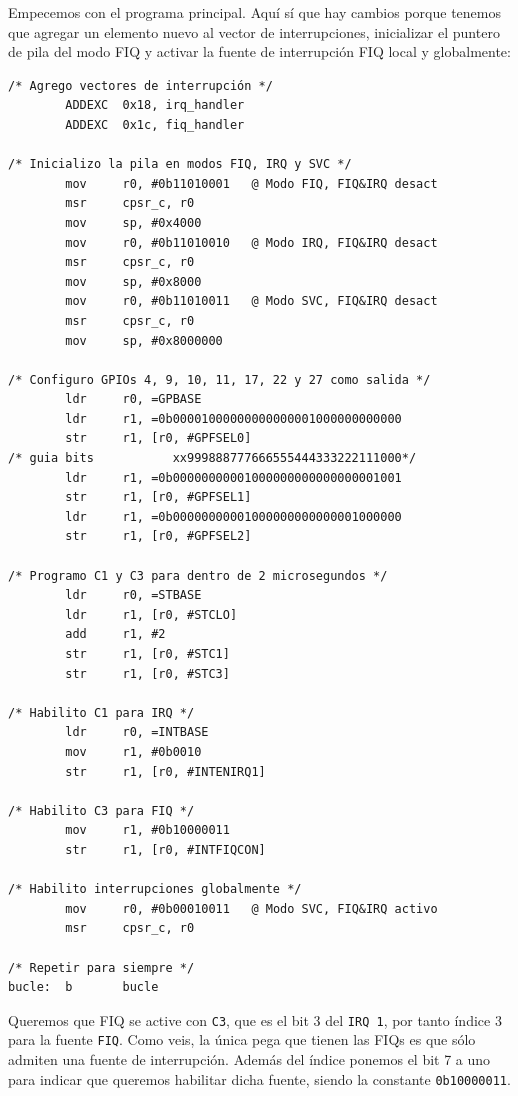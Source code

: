 Empecemos con el programa principal. Aquí sí que hay cambios porque tenemos que agregar un
elemento nuevo al vector de interrupciones, inicializar el puntero de pila del modo FIQ y activar
la fuente de interrupción FIQ local y globalmente:

\newpage
\begin{lstlisting}[caption={Programa principal de inter5.s},label={lst:codigoPract5_5}]
/* Agrego vectores de interrupción */
        ADDEXC  0x18, irq_handler
        ADDEXC  0x1c, fiq_handler

/* Inicializo la pila en modos FIQ, IRQ y SVC */
        mov     r0, #0b11010001   @ Modo FIQ, FIQ&IRQ desact
        msr     cpsr_c, r0
        mov     sp, #0x4000
        mov     r0, #0b11010010   @ Modo IRQ, FIQ&IRQ desact
        msr     cpsr_c, r0
        mov     sp, #0x8000
        mov     r0, #0b11010011   @ Modo SVC, FIQ&IRQ desact
        msr     cpsr_c, r0
        mov     sp, #0x8000000

/* Configuro GPIOs 4, 9, 10, 11, 17, 22 y 27 como salida */
        ldr     r0, =GPBASE
        ldr     r1, =0b00001000000000000001000000000000
        str     r1, [r0, #GPFSEL0]
/* guia bits           xx999888777666555444333222111000*/
        ldr     r1, =0b00000000001000000000000000001001
        str     r1, [r0, #GPFSEL1]
        ldr     r1, =0b00000000001000000000000001000000
        str     r1, [r0, #GPFSEL2]

/* Programo C1 y C3 para dentro de 2 microsegundos */
        ldr     r0, =STBASE
        ldr     r1, [r0, #STCLO]
        add     r1, #2
        str     r1, [r0, #STC1]
        str     r1, [r0, #STC3]

/* Habilito C1 para IRQ */
        ldr     r0, =INTBASE
        mov     r1, #0b0010
        str     r1, [r0, #INTENIRQ1]

/* Habilito C3 para FIQ */
        mov     r1, #0b10000011
        str     r1, [r0, #INTFIQCON]

/* Habilito interrupciones globalmente */
        mov     r0, #0b00010011   @ Modo SVC, FIQ&IRQ activo
        msr     cpsr_c, r0

/* Repetir para siempre */
bucle:  b       bucle
\end{lstlisting}

Queremos que FIQ se active con {\tt C3}, que es el bit 3 del {\tt IRQ 1}, por tanto
índice 3 para la fuente {\tt FIQ}. Como veis, la única pega que tienen las FIQs es que
sólo admiten una fuente de interrupción. Además del índice ponemos el bit 7 a uno para
indicar que queremos habilitar dicha fuente, siendo la constante {\tt 0b10000011}.

